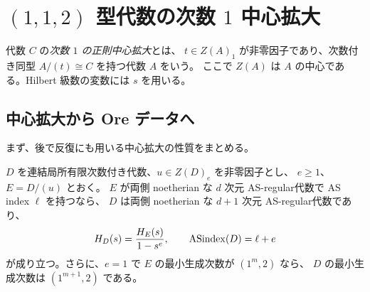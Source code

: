 \section{\texorpdfstring{$(1,1,2)$}{(1,1,2)} 型代数の次数 \texorpdfstring{$1$}{1} 中心拡大}
\label{sec:central}

代数 $C$ の\emph{次数 $1$ の正則中心拡大}とは、
$t\in Z(A)_1$ が非零因子であり、次数付き同型 $A/(t)\cong C$ を持つ代数 $A$ をいう。
ここで $Z(A)$ は $A$ の中心である。Hilbert 級数の変数には $s$ を用いる。

\subsection{中心拡大から Ore データへ}

まず、後で反復にも用いる中心拡大の性質をまとめる。

\begin{lemma}\label{lem:central-lift}
$D$ を連結局所有限次数付き代数、$u\in Z(D)_e$ を非零因子とし、
$e\ge1$、$E=D/(u)$ とおく。
$E$ が両側 noetherian な $d$ 次元 AS-regular代数で AS index $\ell$ を持つなら、
$D$ は両側 noetherian な $d+1$ 次元 AS-regular代数であり、
\[
  H_D(s)=\frac{H_E(s)}{1-s^e},\qquad
  \operatorname{ASindex}(D)=\ell+e
\]
が成り立つ。さらに、$e=1$ で $E$ の最小生成次数が $(1^m,2)$ なら、
$D$ の最小生成次数は $(1^{m+1},2)$ である。
\end{lemma}

